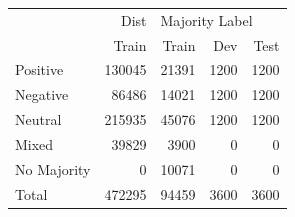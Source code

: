 \begin{tabular}{lrrrr}
\toprule
{} &    Dist & \multicolumn{3}{l}{Majority Label} \\
{} &   Train &          Train &   Dev &  Test \\
\midrule
Positive    &  130045 &          21391 &  1200 &  1200 \\
Negative    &   86486 &          14021 &  1200 &  1200 \\
Neutral     &  215935 &          45076 &  1200 &  1200 \\
Mixed       &   39829 &           3900 &     0 &     0 \\
No Majority &       0 &          10071 &     0 &     0 \\
Total       &  472295 &          94459 &  3600 &  3600 \\
\bottomrule
\end{tabular}

